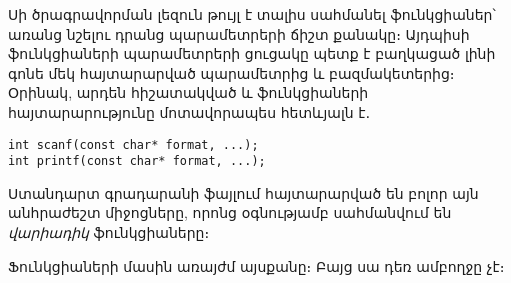 Սի ծրագրավորման լեզուն թույլ է տալիս սահմանել ֆունկցիաներ՝ առանց նշելու
դրանց պարամետրերի ճիշտ քանակը։ Այդպիսի ֆունկցիաների պարամետրերի ցուցակը
պետք է բաղկացած լինի գոնե մեկ հայտարարված պարամետրից և բազմակետերից։
Օրինակ, արդեն հիշատակված  և  ֆունկցիաների
հայտարարությունը մոտավորապես հետևյալն է․

\begin{Verbatim}
int scanf(const char* format, ...);
int printf(const char* format, ...);
\end{Verbatim}

Ստանդարտ գրադարանի  ֆայլում հայտարարված են բոլոր այն
անհրաժեշտ միջոցները, որոնց օգնությամբ սահմանվում են \emph{վարիադիկ}
ֆունկցիաները։

Ֆունկցիաների մասին առայժմ այսքանը։ Բայց սա դեռ ամբողջը չէ։

